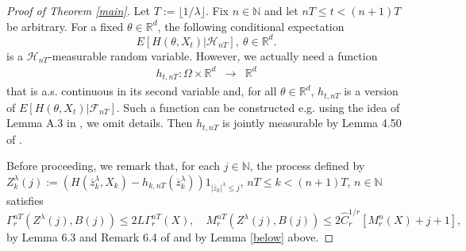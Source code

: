\documentclass[a4paper]{article}
\begin{document}
\begin{proof}[ Proof of Theorem \ref{main}] Let $T:=\lfloor 1/\lambda\rfloor$.
	Fix $n\in\mathbb{N}$ and let $nT\leq t<(n+1)T$ be arbitrary.
	For a fixed $\theta \in \mathbb{R}^d$, the following conditional expectation
	$$
	E[H(\theta,X_t)\vert\mathcal{H}_{nT}],\ \theta\in\mathbb{R}^d.
	$$
	is a $\mathcal{H}_{nT}$-measurable random variable. However, we actually need a function
	\begin{eqnarray}
	h_{t,nT}: \Omega \times \mathbb{R}^d &\to& \mathbb{R}^d
	\end{eqnarray}
	that is a.s. continuous in its second variable and, for all $\theta\in\mathbb{R}^d$,
$h_{t,nT}$ is a version of $E[H(\theta,X_t)\vert\mathcal{F}_{nT}]$. Such a function can be constructed e.g. using the idea of Lemma A.3
in \cite{rst}, we omit details.
Then $h_{t,nT}$ is jointly measurable by Lemma 4.50 of \cite{ab}.

Before proceeding, we remark that, for each $j\in\mathbb{N}$, the process defined by
$Z_k^{\lambda}(j):=(H(\overline{z}_k^{\lambda},X_k)-h_{k,nT}(\overline{z}_k^{\lambda}))1_{|\overline{z}_k|^{\lambda}\leq j}$, $nT\leq k<(n+1)T$, $n\in\mathbb{N}$
satisfies
\begin{equation}\label{wq}
\Gamma^{nT}_r(Z^{\lambda}(j),B(j))\leq 2L\Gamma^{nT}_r(X),\quad
M^{nT}_r(Z^{\lambda}(j),B(j))\leq 2\hat{C}^{1/r}_r[M_r^n(X)+j+1],
\end{equation}
by Lemma 6.3 and Remark 6.4 of \cite{4} and by Lemma \ref{below} above.


\end{proof}
\end{document}
